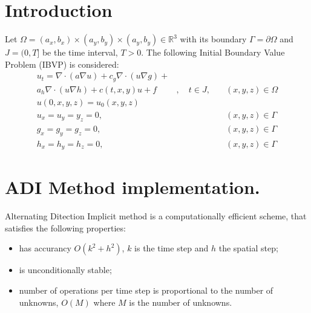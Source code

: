 \documentclass[12pt]{article}
\begin{document}
\section{Introduction}
Let $\Omega=(a_x, b_x)\times(a_y, b_y) \times (a_y, b_y) \in
\mathbb{R}^3$ with its boundary $\Gamma=\partial \Omega$ and
$J=(0,T]$ be the time interval, $T>0$. The following Initial Boundary
Value Problem (IBVP) is considered:
\begin{eqnarray}
u_t= \nabla\cdot(a\nabla u) + c_g\nabla\cdot(u \nabla g) +  \nonumber \\
a_h\nabla\cdot(u \nabla h) +c(t, x, y) u + f&, \quad t\in J, &\quad 
(x,y,z)\in \Omega \label{eq:heat}\\
u(0,x,y,z) = u_0(x,y,z)\\
u_x=u_y=y_z = 0,&  &\quad (x,y,z) \in \Gamma \\ 
g_x=g_y=g_z = 0, & &\quad (x,y,z) \in\Gamma \\
h_x=h_y=h_z = 0, & &\quad (x,y,z) \in\Gamma 
\end{eqnarray}


\section{ADI Method implementation.}
Alternating Ditection Implicit method is a computationally efficient
scheme, that satisfies the
  following properties:
  \begin{itemize}
\item has accurancy $O(k^2 + h^2)$, $k$ is the time step and $h$ the
spatial step;
    \item is unconditionally stable;
\item number of operations per time step is proportional to the number
of unknowns, $O(M)$
     where $M$ is the number of unknowns.       
  \end{itemize}
\end{document}
